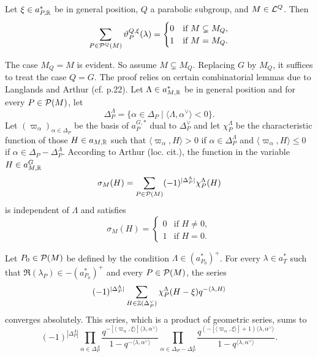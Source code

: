 \begin{paragr}
\begin{lemme} \label{lem:xigeneral} Let $\xi\in a_{P,\mathbb{R}}^*$ be in general position, $Q$ a parabolic subgroup, and $M\in \mathcal{L}^Q$. Then
$$\sum_{P\in \mathcal{P}^Q(M)} \vartheta_P^{Q,\xi}(\lambda)=\begin{cases} 0 & \text{if } M\subsetneq M_Q, \\ 1 & \text{if } M=M_Q. \end{cases}$$
\end{lemme}

\begin{preuve}
The case $M_Q=M$ is evident. So assume $M\subsetneq M_Q$. Replacing $G$ by $M_Q$, it suffices to treat the case $Q=G$. The proof relies on certain combinatorial lemmas due to Langlands and Arthur (cf. \cite{localtrace} p.22). Let $\Lambda\in a_{M,\mathbb{R}}^*$ be in general position and for every $P\in \mathcal{P}(M)$, let 
$$\Delta_P^{\Lambda}=\{\alpha\in \Delta_P\mid \langle\Lambda,\alpha^\vee \rangle <0\}.$$
Let $(\varpi_\alpha)_{\alpha \in \Delta_P}$ be the basis of $a_P^{G,*}$ dual to $\Delta_P^\vee$ and let $\chi_P^{\Lambda}$ be the characteristic function of those $H\in a_{M,\mathbb{R}}$ such that $\langle \varpi_\alpha, H\rangle>0$ if $\alpha\in \Delta_P^{\Lambda}$ and $\langle \varpi_\alpha, H\rangle\leq 0$ if $\alpha\in \Delta_P-\Delta_P^{\Lambda}$.
According to Arthur (loc. cit.), the function in the variable $H\in a_{M,\mathbb{R}}^G$
$$\sigma_M(H)=\sum_{P\in \mathcal{P}(M)} (-1)^{|\Delta_P^{\Lambda}|}\chi_P^{\Lambda}(H)$$
is independent of $\Lambda$ and satisfies
\begin{equation}
  \label{eq:sigmaM}
  \sigma_M(H)= \begin{cases}
    0 & \text{if } H\neq 0,\\
1 & \text{if } H=0.
  \end{cases}
\end{equation}

Let $P_0\in \mathcal{P}(M)$ be defined by the condition $\Lambda\in (a_{P_0}^*)^{+}$.
For every $\lambda \in a_T^*$ such that $\Re(\lambda_P)\in -(a_{P_0}^*)^{+}$ and every $P\in \mathcal{P}(M)$, the series 
$$(-1)^{|\Delta_P^{\Lambda}|}\sum_{H\in \mathbb{Z}(\Delta_P^\vee)} \chi_P^{\Lambda}(H-\xi)q^{-\langle \lambda, H\rangle}$$
converges absolutely. This series, which is a product of geometric series, sums to 
$$(-1)^{|\Delta_P^{\Lambda}|} \prod_{\alpha\in \Delta_P^\Lambda} \frac{q^{-[\langle \varpi_\alpha, \xi\rangle] \langle \lambda, \alpha^\vee\rangle}}{1-q^{-\langle \lambda, \alpha^\vee\rangle}}\prod_{ \alpha\in \Delta_P-\Delta_P^{\Lambda} } \frac{q^{(-[\langle \varpi_\alpha, \xi\rangle]+1) \langle \lambda, \alpha^\vee\rangle}}{1-q^{\langle \lambda, \alpha^\vee\rangle}}.$$


\end{preuve}
\end{paragr}
